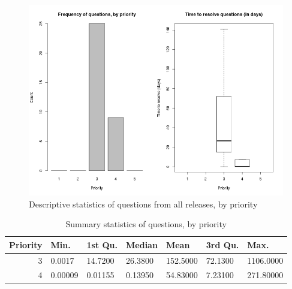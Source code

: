 \documentclass[a4paper]{scrartcl}
\begin{document}
\begin{figure}
\begin{center}
\includegraphics[width=6in]{exploratory_results/mongodb_allreleases/questions}
\caption{Descriptive statistics of questions from all releases, by priority}
\label{fig:all_questions}
\end{center}
\end{figure}

\begin{table}[h!]
\caption{Summary statistics of questions, by priority}
\centering
\begin{tabular}{ r | l | l | l | l |  l | l }
\hline
Priority & Min. & 1st Qu. & Median & Mean & 3rd Qu. & Max. \\
\hline\hline
3 & 0.0017 & 14.7200 & 26.3800 & 152.5000 & 72.1300 & 1106.0000 \\
4 & 0.00009 & 0.01155 & 0.13950 & 54.83000 & 7.23100 & 271.80000 \\
\hline
\end{tabular}
\label{tab:all_questions_summary}
\end{table}
\end{document}
